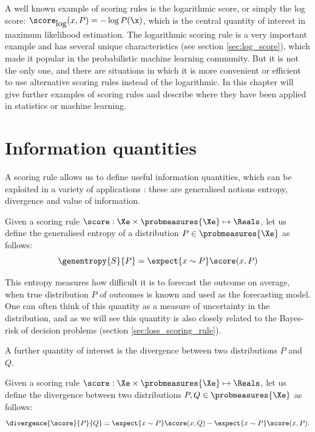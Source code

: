 A well known example of scoring rules is the logarithmic score, or simply the log score: $\score_{\mbox{log}}(x,P) = -\log P(\x)$, which is the central quantity of interest in maximum likelihood estimation. The logarithmic scoring rule is a very important example and has several unique characteristics (see section \ref{sec:log_score}), which made it popular in the probabilistic machine learning community. But it is not the only one, and there are situations in which it is more convenient or efficient to use alternative scoring rules instead of the logarithmic. In this chapter will give further examples of scoring rules and describe where they have been applied in statistics or machine learning.

\section{Information quantities}

A scoring rule allows us to define useful information quantities, which can be exploited in a variety of applications \cite[see also][]{Blaetal2332}: these are generalised notions entropy, divergence and value of information.

\begin{definition}
Given a scoring rule $\score:\Xe\times\probmeasures{\Xe}\mapsto\Reals$, let us define the generalised entropy of a distribution $P\in\probmeasures{\Xe}$ as follows:
\begin{equation}
	\genentropy{S}{P}= \expect{x\sim P} \score(x,P)
\end{equation}
\end{definition}


This entropy measures how difficult it is to forecast the outcome on average, when true distribution $P$ of outcomes is known and used as the forecasting model. One can often think of this quantity as a measure of uncertainty in the distribution, and as we will see this quantity is also closely related to the Bayes-risk of decision problems (section \ref{sec:loss_scoring_rule}).

A further quantity of interest is the divergence between two distributions $P$ and $Q$.

\begin{definition}\label{def:generalised_divergence}
Given a scoring rule $\score:\Xe\times\probmeasures{\Xe}\mapsto\Reals$, let us define the divergence between two distributions $P,Q\in\probmeasures{\Xe}$ as follows:
	\begin{equation}
		\divergence{\score}{P}{Q} = \expect{x\sim P} \score(x,Q) - \expect{x\sim P} \score(x,P)\mbox{.}\label{eqn:def_divergence}
	\end{equation}
\end{definition}

